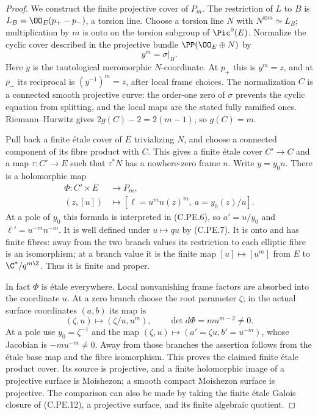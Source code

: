 \begin{proof}
We construct the finite projective cover of $P_m$.
The restriction of $L$ to $B$ is
$L_B=\OO_E(p_+-p_-)$, a torsion line. Choose a torsion
line $N$ with $N^{\otimes m}\simeq L_B$; multiplication
by $m$ is onto on the torsion subgroup of $\Pic^0(E)$.
Normalize the cyclic cover described in the projective
bundle $\PP(\OO_E\oplus N)$ by
\[
                             y^m=\sigma|_B.              \tag{C.PE.11}
\]
Here $y$ is the tautological meromorphic $N$-coordinate.
At $p_+$ this is $y^m=z$, and at $p_-$ its reciprocal
is $(y^{-1})^m=z$, after local frame choices. The
normalization $C$ is a connected smooth projective
curve: the order-one zero of $\sigma$ prevents the
cyclic equation from splitting, and the local maps
are the stated fully ramified ones. Riemann--Hurwitz
gives $2g(C)-2=2(m-1)$, so $g(C)=m$.

Pull back a finite \'etale cover of $E$ trivializing
$N$, and choose a connected component of its fibre
product with $C$. This gives a finite \'etale cover
$C'\to C$ and a map $\tau:C'\to E$ such that
$\tau^*N$ has a nowhere-zero frame $n$. Write
$y=y_0n$. There is a holomorphic map
\[
 \begin{split}
 \Phi:C'\times E&\longrightarrow P_m,\\
 (z,[u])&\longmapsto
       [\ell=u^m n(z)^m,\ a=y_0(z)/u].
 \end{split}                                             \tag{C.PE.12}
\]
At a pole of $y_0$ this formula is interpreted in
(C.PE.6), so $a'=u/y_0$ and $\ell'=u^{-m}n^{-m}$.
It is well defined under $u\mapsto qu$ by (C.PE.7).
It is onto and has finite fibres: away from the two
branch values its restriction to each elliptic fibre
is an isomorphism; at a branch value it is the finite
map $[u]\mapsto[u^m]$ from $E$ to
$\C^*/q^{m\Z}$. Thus it is finite and proper.

In fact $\Phi$ is \'etale everywhere. Local nonvanishing
frame factors are absorbed into the coordinate $u$.
At a zero branch choose the root parameter $\zeta$;
in the actual surface coordinates
$(a,b)$ its map is
\[
             (\zeta,u)\longmapsto(\zeta/u,u^m),
             \qquad \det d\Phi=m u^{m-2}\ne0.           \tag{C.PE.13}
\]
At a pole use $y_0=\zeta^{-1}$ and the map
$(\zeta,u)\mapsto(a'=\zeta u,b'=u^{-m})$, whose
Jacobian is $-m u^{-m}\ne0$. Away from those branches
the assertion follows from the \'etale base map and
the fibre isomorphism. This proves the claimed finite
\'etale product cover. Its source is projective, and
a finite holomorphic image of a projective surface is
Moishezon; a smooth compact Moishezon surface is
projective. The comparison can also be made by taking
the finite \'etale Galois closure of (C.PE.12), a
projective surface, and its finite algebraic quotient.


\end{proof}
